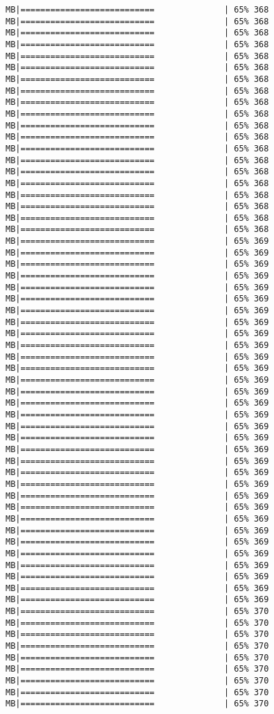 \documentclass[
]{article}
\begin{document}
\begin{verbatim}
MB|===========================              | 65% 368 MB|===========================              | 65% 368 MB|===========================              | 65% 368 MB|===========================              | 65% 368 MB|===========================              | 65% 368 MB|===========================              | 65% 368 MB|===========================              | 65% 368 MB|===========================              | 65% 368 MB|===========================              | 65% 368 MB|===========================              | 65% 368 MB|===========================              | 65% 368 MB|===========================              | 65% 368 MB|===========================              | 65% 368 MB|===========================              | 65% 368 MB|===========================              | 65% 368 MB|===========================              | 65% 368 MB|===========================              | 65% 368 MB|===========================              | 65% 368 MB|===========================              | 65% 368 MB|===========================              | 65% 368 MB|===========================              | 65% 369 MB|===========================              | 65% 369 MB|===========================              | 65% 369 MB|===========================              | 65% 369 MB|===========================              | 65% 369 MB|===========================              | 65% 369 MB|===========================              | 65% 369 MB|===========================              | 65% 369 MB|===========================              | 65% 369 MB|===========================              | 65% 369 MB|===========================              | 65% 369 MB|===========================              | 65% 369 MB|===========================              | 65% 369 MB|===========================              | 65% 369 MB|===========================              | 65% 369 MB|===========================              | 65% 369 MB|===========================              | 65% 369 MB|===========================              | 65% 369 MB|===========================              | 65% 369 MB|===========================              | 65% 369 MB|===========================              | 65% 369 MB|===========================              | 65% 369 MB|===========================              | 65% 369 MB|===========================              | 65% 369 MB|===========================              | 65% 369 MB|===========================              | 65% 369 MB|===========================              | 65% 369 MB|===========================              | 65% 369 MB|===========================              | 65% 369 MB|===========================              | 65% 369 MB|===========================              | 65% 369 MB|===========================              | 65% 369 MB|===========================              | 65% 370 MB|===========================              | 65% 370 MB|===========================              | 65% 370 MB|===========================              | 65% 370 MB|===========================              | 65% 370 MB|===========================              | 65% 370 MB|===========================              | 65% 370 MB|===========================              | 65% 370 MB|===========================              | 65% 370 
\end{verbatim}
\end{document}
